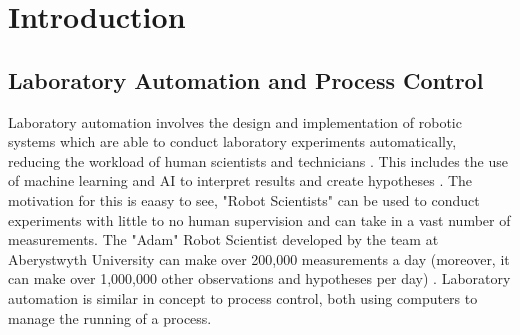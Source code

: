 \documentclass[a4]{report}
\def\achapter{preamble}
\begin{document}
	\newpage
	\setcounter{page}{1}
	
	\chapter*{Introduction}
	\def\achapter{Introduction}



	\section{Laboratory Automation and Process Control}
	Laboratory automation involves the design and implementation of robotic systems which are able to conduct laboratory experiments automatically, reducing the workload of human scientists and technicians \cite{backwhatisauto}. This includes the use of machine learning and AI to interpret results and create hypotheses \cite{backlitrevai, backbaconauto, backlabauto}. The motivation for this is eaasy to see, "Robot Scientists" can be used to conduct experiments with little to no human supervision and can take in a vast number of measurements. The "Adam" Robot Scientist developed by the team at Aberystwyth University can make over 200,000 measurements a day (moreover, it can make over 1,000,000 other observations and hypotheses per day)  \cite{backontorobsci}. \newline \newline \noindent
	Laboratory automation is similar in concept to process control, both using computers to manage the running of a process. %
\end{document}
